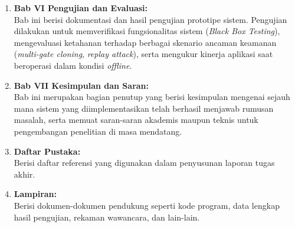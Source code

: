 \begin{enumerate}
\item	\textbf{Bab VI Pengujian dan Evaluasi:} \\
Bab ini berisi dokumentasi dan hasil pengujian prototipe sistem. Pengujian dilakukan untuk memverifikasi fungsionalitas sistem (\textit{Black Box Testing}), mengevaluasi ketahanan terhadap berbagai skenario ancaman keamanan (\textit{multi-gate cloning}, \textit{replay attack}), serta mengukur kinerja aplikasi saat beroperasi dalam kondisi \textit{offline}.                  
\item   \textbf{Bab VII Kesimpulan dan Saran:} \\
Bab ini merupakan bagian penutup yang berisi kesimpulan mengenai sejauh mana sistem yang diimplementasikan telah berhasil menjawab rumusan masalah, serta memuat saran-saran akademis maupun teknis untuk pengembangan penelitian di masa mendatang.
\item   \textbf{Daftar Pustaka:} \\
Berisi daftar referensi yang digunakan dalam penyusunan laporan tugas akhir.
\item   \textbf{Lampiran:} \\
Berisi dokumen-dokumen pendukung seperti kode program, data lengkap hasil pengujian, rekaman wawancara, dan lain-lain. 
\end{enumerate}